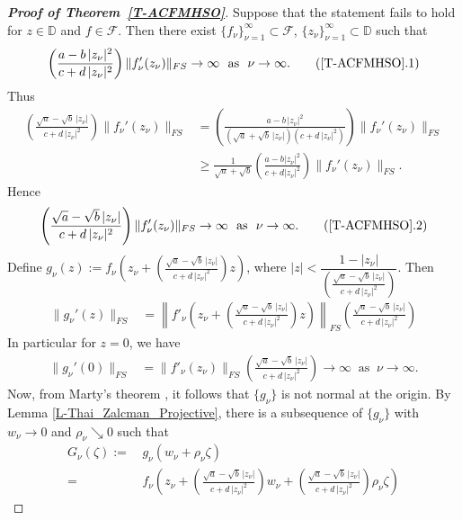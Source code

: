 \documentclass[11pt, reqno]{amsart}
\theoremstyle{definition}
\theoremstyle{remark}
\numberwithin{equation}{section}
\begin{document}
\begin{proof}[{\bf Proof of Theorem~\ref{T-ACFMHSO}}]
Suppose that the statement fails to hold for $z\in \mathbb D$ and $f\in\mathcal F$. Then there exist $\{f_{\nu}\}_{\nu=1}^\infty\subset \mathcal F$, $\{z_{\nu}\}_{\nu=1}^\infty\subset\mathbb D$ such that 
\begin{align*}
    \left(\frac{a-b\,|z_{\nu}|^2}{c+d\,|z_{\nu}|^2}\right)\|f_{\nu}'(z_{\nu})\|_{FS}\to\infty\ \text{ as }\ \nu\to\infty.\label{ACFMHSO.1} \tag{\ref*{T-ACFMHSO}.1}
\end{align*}
Thus \begin{align*}
    \left(\frac{\sqrt{a}-\sqrt{b}\,|z_{\nu}|}{c+d\,|z_{\nu}|^2}\right)\|f_{\nu}'(z_{\nu})\|_{FS}&=\left(\frac{a-b\,|z_{\nu}|^2}{(\sqrt{a}+\sqrt{b}\,|z_{\nu}|)(c+d\,|z_{\nu}|^2)}\right)\|f_{\nu}'(z_{\nu})\|_{FS}\\
    &\geq \frac{1}{\sqrt{a}+\sqrt{b}}\left(\frac{a-b|z_{\nu}|^2}{c+d|z_{\nu}|^2}\right)\|f_{\nu}'(z_{\nu})\|_{FS}.
\end{align*}
Hence \begin{align*}
\left(\frac{\sqrt{a}-\sqrt{b}\,|z_{\nu}|}{c+d\,|z_{\nu}|^2}\right)\|f_{\nu}'(z_{\nu})\|_{FS}\to\infty\ \text{ as }\ \nu\to\infty. \label{ACFMHSO.2} \tag{\ref*{T-ACFMHSO}.2} \end{align*}
Define $g_{\nu}(z):=f_{\nu}\left(z_{\nu}+\left(\frac{\sqrt{a}-\sqrt{b}\,|z_{\nu}|}{c+d\,|z_{\nu}|^2}\right)z\right)$, where $|z|<\dfrac{1-|z_{\nu}|}{\left(\frac{\sqrt{a}-\sqrt{b}\,|z_{\nu}|}{c+d\,|z_{\nu}|^2}\right)}$.
Then \begin{align*} \|g_{\nu}'(z)\|_{FS}&=\left\|f'_{\nu}\left(z_{\nu}+\left(\frac{\sqrt{a}-\sqrt{b}\,|z_{\nu}|}{c+d\,|z_{\nu}|^2}\right)z\right)\right\|_{FS} \left(\frac{\sqrt{a}-\sqrt{b}\,|z_{\nu}|}{c+d\,|z_{\nu}|^2}\right)
\end{align*}
    In particular for $z=0$, we have
    \begin{align*}
    \|g_{\nu}'(0)\|_{FS}&= \|f'_{\nu}(z_{\nu})\|_{FS} \left(\frac{\sqrt{a}-\sqrt{b}\,|z_{\nu}|}{c+d\,|z_{\nu}|^2}\right)\to\infty\ \text{ as }\ \nu\to\infty.
\end{align*}
Now, from Marty's theorem \cite[p. 4]{ere-nhcfprtps-2007}, it follows that $\{g_{\nu}\}$ is not normal at the origin.
By Lemma \ref{L-Thai_Zalcman_Projective}, there is a subsequence of $\{g_{\nu}\}$ with $w_{\nu}\to 0$ and $\rho_{\nu}\searrow 0$ such that
\begin{align*}
    G_{\nu}(\zeta):=&\,g_{\nu}(w_{\nu}+\rho_{\nu}\zeta)\\
    =&\,f_{\nu}\left(z_{\nu}+\left(\frac{\sqrt{a}-\sqrt{b}\,|z_{\nu}|}{c+d\,|z_{\nu}|^2}\right)w_{\nu}+\left(\frac{\sqrt{a}-\sqrt{b}\,|z_{\nu}|}{c+d\,|z_{\nu}|^2}\right)\rho_{\nu}\zeta\right)

\end{align*}
\end{proof}
\end{document}
